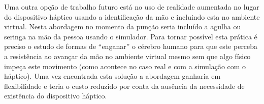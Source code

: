 Uma outra opção de trabalho futuro está no uso de realidade aumentada no lugar do dispositivo háptico usando a identificação da mão e incluindo esta no ambiente virtual. Nesta abordagem no momento da punção seria incluído a agulha ou seringa na mão da pessoa usando o simulador. Para tornar possível esta prática é preciso o estudo de formas de ``enganar'' o cérebro humano para que este perceba a resistência ao avançar da mão no ambiente virtual mesmo sem que algo físico impeça este movimento (como acontece no caso real e com a simulação com o háptico). Uma vez encontrada esta solução a abordagem ganharia em flexibilidade e teria o custo reduzido por conta da ausência da necessidade de existência do dispositivo háptico.